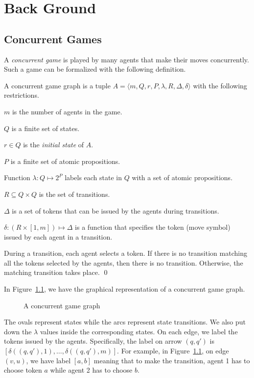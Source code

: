 \chapter{Back Ground}

\section{Concurrent Games}
A {\em concurrent game} is played by many agents 
that make their moves concurrently.  
Such a game can be formalized \label{reply1.be.formalized} with the following definition.  

\begin{definition}
A concurrent game graph is a tuple 
$A=\langle m,Q,r,P,\lambda,R,\Delta,\delta\rangle$
with the following restrictions.
\begin{list1}
\item 
	$m$ is the number of agents in the game.
\item 
	$Q$ is a finite set of states.
\item 
	$r\in Q$ is the {\em initial state} of $A$.
\item 
	$P$ is a finite set of atomic propositions.
\item Function 
	$\lambda:Q\mapsto 2^P$ labels each 
	state in $Q$ with a set of atomic propositions.
\item 
	$R\subseteq Q\times Q$ is the set of transitions.
\item 
	$\Delta$ is a set of tokens that can be issued 
	by the agents during transitions.  
\item 
	$\delta:(R\times [1,m])\mapsto \Delta$ is a function that specifies the
    token (move symbol) issued by each agent in a transition.
\end{list1}
\end{definition} 
During a transition, each agent selects a token.  
If there is no transition matching all the tokens selected by the agents, 
then there is no transition.  
Otherwise, the matching transition takes place.  
\qed 


In Figure~\ref{fig.cg}, we have the graphical representation of a concurrent game graph.  
\begin{figure}[!ht]
\begin{center}
\end{center}
\caption{A concurrent game graph}
\label{fig.cg}
\end{figure} 
The ovals represent states while the arcs represent 
state transitions.  
We also put down the $\lambda$ values inside the corresponding states. 
On each edge, we label the tokens issued by the agents. 
Specifically, the label on arrow $(q,q')$ is 
$[\delta((q,q'),1),\ldots,\delta((q,q'),m)]$.  
For example, in Figure~\ref{fig.cg}, 
on edge $(v,u)$, we have label $[a,b]$ meaning that 
to make the transition, agent 1 has to choose token $a$ while 
agent 2 has to choose $b$.  

